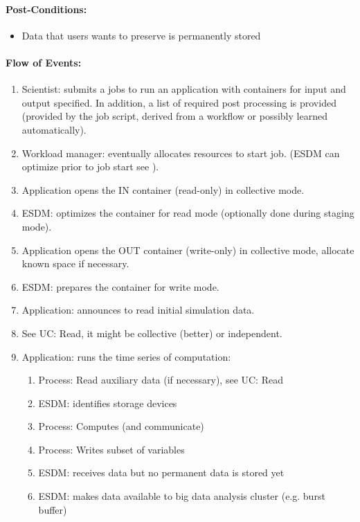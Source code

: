 \paragraph{Post-Conditions:}
\begin{itemize}
	\item Data that users wants to preserve is permanently stored
\end{itemize}




\paragraph{Flow of Events:}
\begin{enumerate}
	\item Scientist: submits a jobs to run an application with containers for input and output specified. In addition, a list of required post processing is provided (provided by the job script, derived from a workflow or possibly learned automatically).
	\item Workload manager: eventually allocates resources to start job. (ESDM can optimize prior to job start see ).
	\item Application opens the IN container (read-only) in collective mode.
	\item ESDM: optimizes the container for read mode (optionally done during staging mode).
	\item Application opens the OUT container (write-only) in collective mode, allocate known space if necessary.
	\item ESDM: prepares the container for write mode.
	\item Application: announces to read initial simulation data.
	\item See UC: Read, it might be collective (better) or independent.
	\item Application: runs the time series of computation:
	\begin{enumerate}
		\item Process: Read auxiliary data (if necessary), see UC: Read
		\item ESDM: identifies storage devices
		\item Process: Computes (and communicate)
		\item Process: Writes subset of variables
		\item ESDM: receives data but no permanent data is stored yet
		\item ESDM: makes data available to big data analysis cluster (e.g. burst buffer)

\end{enumerate}
\end{enumerate}
